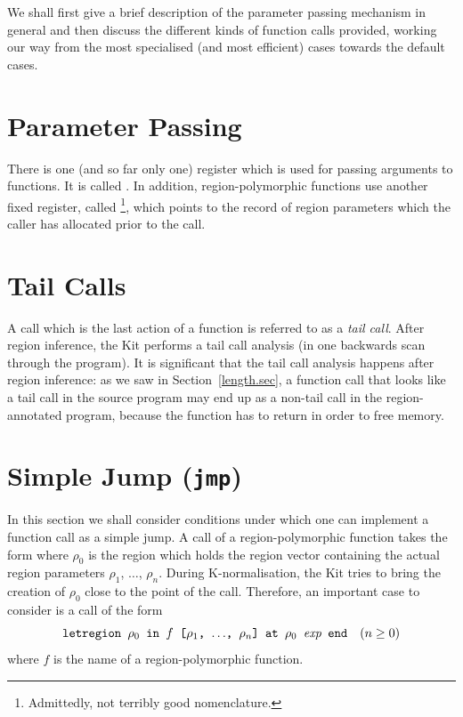 \documentclass[12pt]{book}
\begin{document}
We shall first give a brief description of the parameter passing mechanism in general
and then discuss the different kinds of function calls provided, working our way from 
the most specialised (and most efficient) cases towards the default  cases.
\section{Parameter Passing}
There is one (and so far only one) register which is used for passing arguments
to functions. It is called . In addition, region-polymorphic functions
use another fixed register, 
called \footnote{Admittedly, not terribly good nomenclature.},
which points to the record of region parameters which the caller has allocated prior to the call.
\section{Tail Calls}
\label{tailcall.sec}
A call which is the last action of a function is 
referred to as a {\em tail call}. After region inference, the Kit performs a 
tail call analysis (in one backwards scan through the program). It is significant that
the tail call analysis happens after region inference: 
as we saw in Section~\ref{length.sec}, a function call that
looks like a tail call in the 
source program may end up as a non-tail call in the
region-annotated program, because the function  has to return 
in order to free memory.
\section{Simple Jump ({\tt jmp})}
\label{simplejump.sec}
In this section we shall consider conditions under which one can
implement a function call as a simple jump. A call of a region-polymorphic
function takes the form  where $\rho_0$ is the region which holds the region vector
containing the actual region parameters $\rho_1$, $\ldots$, $\rho_n$. 
During K-normalisation, the Kit tries to bring the creation of $\rho_0$ close to the point of
the call. Therefore, an important case to consider is a call of the form
\begin{equation}
\label{ntcall}
\hbox{\tt letregion $\rho_0$ in $f$ [$\rho_1$, $\ldots$, $\rho_n$] at $\rho_0$ $\hbox{\it exp}$ end}\quad (n\geq0)
\end{equation}
where $f$ is the name of a region-polymorphic function.
\end{document}
